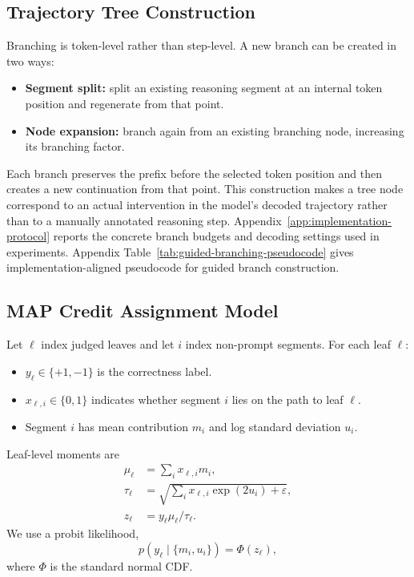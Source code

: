 \documentclass{article}
\begin{document}
\subsection{Trajectory Tree Construction}
Branching is token-level rather than step-level. A new branch can be created in two ways:
\begin{itemize}
    \item \textbf{Segment split:} split an existing reasoning segment at an internal token position and regenerate from that point.
    \item \textbf{Node expansion:} branch again from an existing branching node, increasing its branching factor.
\end{itemize}

Each branch preserves the prefix before the selected token position and then creates a new continuation from that point. This construction makes a tree node correspond to an actual intervention in the model's decoded trajectory rather than to a manually annotated reasoning step. Appendix~\ref{app:implementation-protocol} reports the concrete branch budgets and decoding settings used in experiments.
Appendix Table~\ref{tab:guided-branching-pseudocode} gives implementation-aligned pseudocode for guided branch construction.

\subsection{MAP Credit Assignment Model}
Let $\ell$ index judged leaves and let $i$ index non-prompt segments. For each leaf $\ell$:
\begin{itemize}
    \item $y_\ell \in \{+1,-1\}$ is the correctness label.
    \item $x_{\ell,i} \in \{0,1\}$ indicates whether segment $i$ lies on the path to leaf $\ell$.
    \item Segment $i$ has mean contribution $m_i$ and log standard deviation $u_i$.
\end{itemize}

Leaf-level moments are
\begin{align}
\mu_\ell &= \sum_i x_{\ell,i} m_i, \\
\tau_\ell &= \sqrt{\sum_i x_{\ell,i} \exp(2u_i) + \varepsilon}, \\
z_\ell &= y_\ell \mu_\ell / \tau_\ell.
\end{align}
We use a probit likelihood,
\begin{equation}
p(y_\ell \mid \{m_i,u_i\}) = \Phi(z_\ell),
\end{equation}
where $\Phi$ is the standard normal CDF.
\end{document}
